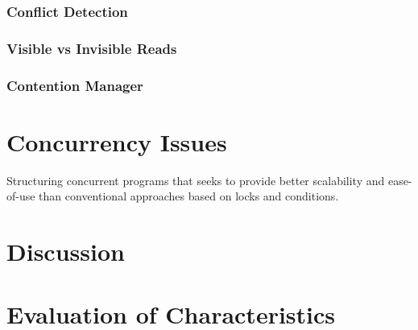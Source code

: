 \subsubsection{Conflict Detection}
\subsubsection{Visible vs Invisible Reads}
\subsubsection{Contention Manager}


\section{Concurrency Issues}
\label{sec:stm_issues}
Structuring concurrent programs that seeks to provide better scalability and ease-of-use than conventional approaches based on locks and conditions.

\section{Discussion}
\label{sec:stm_discussion}


\section{Evaluation of Characteristics}
\label{sec:stm_eval}

\worksheetend